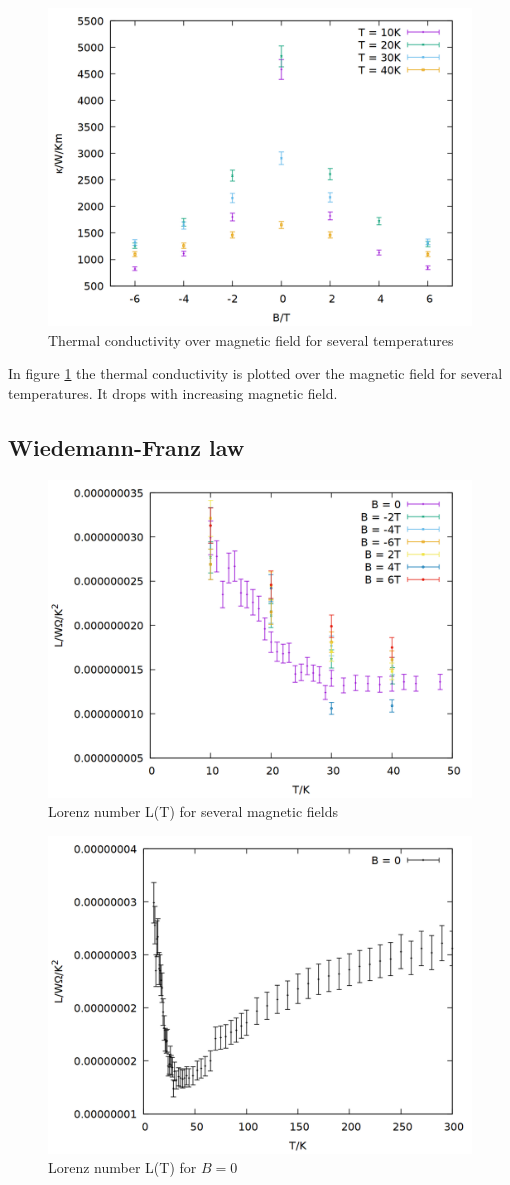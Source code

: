 \begin{figure}
    \centering
    \includegraphics[width=0.7\linewidth]{data/wlf_T.png}
    \caption{Thermal conductivity over magnetic field for several temperatures}
    \label{fig:wlf_T}
\end{figure}

In figure \ref{fig:wlf_T} the thermal conductivity is plotted over the magnetic field for several temperatures. It drops with increasing magnetic field.

\subsection{Wiedemann-Franz law}

\begin{figure}
    \centering
    \includegraphics[width=0.7\linewidth]{data/wiede.png}
    \caption{Lorenz number L(T) for several magnetic fields}
    \label{fig:wiede}
\end{figure}

\begin{figure}
    \centering
    \includegraphics[width=0.7\linewidth]{data/wiede_B0.png}
    \caption{Lorenz number L(T) for $B = 0$}
    \label{fig:wiede_B0}
\end{figure}

